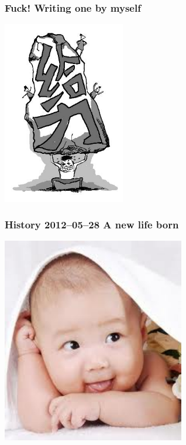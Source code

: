 \documentclass[10pt]{beamer}
\begin{document}
\begin{frame}
  \frametitle{Fuck! Writing one by myself}
 
\begin{center} 
  \includegraphics[width=0.4\textwidth]{geili.jpg}
  
\end{center}

\end{frame}

\begin{frame}
  \frametitle{History 2012--05--28 A new life born}

\begin{center} 
  \includegraphics[width=0.6\textwidth]{newlife.jpg}
 
\end{center}

\end{frame}
\end{document}
